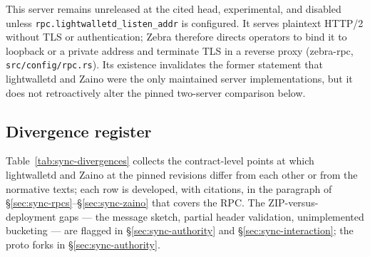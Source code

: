 \documentclass[11pt,a4paper]{article}
\theoremstyle{definition}
\begin{document}
This server remains unreleased at the cited head, experimental, and disabled
unless
\texttt{rpc.\allowbreak lightwalletd\_\allowbreak listen\_\allowbreak addr}
is configured. It serves plaintext
HTTP/2 without TLS or authentication; Zebra therefore directs operators to
bind it to loopback or a private address and terminate TLS in a reverse proxy
(\textsf{zebra-rpc}, \texttt{src/config/rpc.rs}). Its existence invalidates
the former statement that lightwalletd and Zaino were the only maintained
server implementations, but it does not retroactively alter the pinned
two-server comparison below.

\subsection{Divergence register}\label{sec:sync-divergences}

Table~\ref{tab:sync-divergences} collects the contract-level points at
which lightwalletd and Zaino at the pinned revisions differ from each other or
from the normative texts; each row is developed, with citations, in the
paragraph of \S\ref{sec:sync-rpcs}--\S\ref{sec:sync-zaino} that covers the RPC.
The ZIP-versus-deployment gaps --- the message sketch, partial header
validation, unimplemented bucketing --- are flagged in
\S\ref{sec:sync-authority} and \S\ref{sec:sync-interaction}; the proto
forks in \S\ref{sec:sync-authority}.
\end{document}

